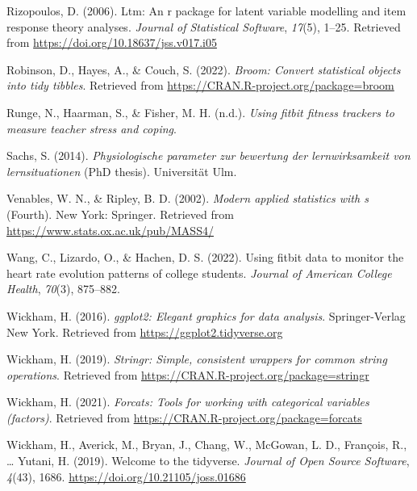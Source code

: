 \documentclass[
  man,floatsintext]{apa6}
\newlength{\cslhangindent}
\newlength{\cslentryspacingunit} %
\newenvironment{CSLReferences}[2] %
 {%
  \setlength{\parindent}{0pt}
  \ifodd #1
  \let\oldpar\par
  \def\par{\hangindent=\cslhangindent\oldpar}
  \fi
  \setlength{\parskip}{#2\cslentryspacingunit}
 }%
 {}
\begin{document}
\begin{CSLReferences}{1}{0}
\leavevmode{}%
Rizopoulos, D. (2006). Ltm: An r package for latent variable modelling and item response theory analyses. \emph{Journal of Statistical Software}, \emph{17}(5), 1--25. Retrieved from \url{https://doi.org/10.18637/jss.v017.i05}

\leavevmode{}%
Robinson, D., Hayes, A., \& Couch, S. (2022). \emph{Broom: Convert statistical objects into tidy tibbles}. Retrieved from \url{https://CRAN.R-project.org/package=broom}

\leavevmode{}%
Runge, N., Haarman, S., \& Fisher, M. H. (n.d.). \emph{Using fitbit fitness trackers to measure teacher stress and coping}.

\leavevmode{}%
Sachs, S. (2014). \emph{Physiologische parameter zur bewertung der lernwirksamkeit von lernsituationen} (PhD thesis). Universit{ä}t Ulm.

\leavevmode{}%
Venables, W. N., \& Ripley, B. D. (2002). \emph{Modern applied statistics with s} (Fourth). New York: Springer. Retrieved from \url{https://www.stats.ox.ac.uk/pub/MASS4/}

\leavevmode{}%
Wang, C., Lizardo, O., \& Hachen, D. S. (2022). Using fitbit data to monitor the heart rate evolution patterns of college students. \emph{Journal of American College Health}, \emph{70}(3), 875--882.

\leavevmode{}%
Wickham, H. (2016). \emph{ggplot2: Elegant graphics for data analysis}. Springer-Verlag New York. Retrieved from \url{https://ggplot2.tidyverse.org}

\leavevmode{}%
Wickham, H. (2019). \emph{Stringr: Simple, consistent wrappers for common string operations}. Retrieved from \url{https://CRAN.R-project.org/package=stringr}

\leavevmode{}%
Wickham, H. (2021). \emph{Forcats: Tools for working with categorical variables (factors)}. Retrieved from \url{https://CRAN.R-project.org/package=forcats}

\leavevmode{}%
Wickham, H., Averick, M., Bryan, J., Chang, W., McGowan, L. D., François, R., \ldots{} Yutani, H. (2019). Welcome to the {tidyverse}. \emph{Journal of Open Source Software}, \emph{4}(43), 1686. \url{https://doi.org/10.21105/joss.01686}


\end{CSLReferences}
\end{document}

